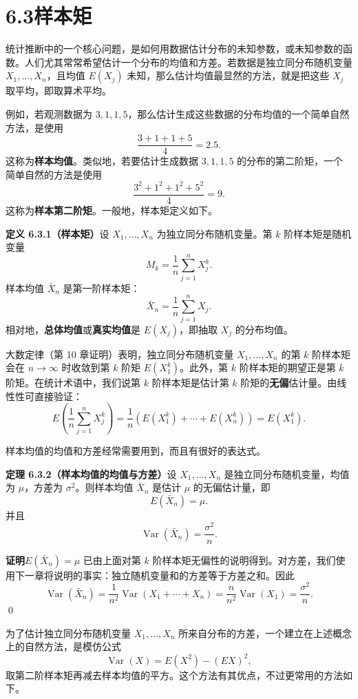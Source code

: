 \documentclass[UTF8,12pt,a4paper,fontset=fandol]{ctexart}
\begin{document}
\section*{6.3\quad 样本矩}

统计推断中的一个核心问题，是如何用数据估计分布的未知参数，或未知参数的函数。人们尤其常常希望估计一个分布的均值和方差。若数据是独立同分布随机变量 $X_1,\ldots,X_n$，且均值 $E(X_j)$ 未知，那么估计均值最显然的方法，就是把这些 $X_j$ 取平均，即取算术平均。

例如，若观测数据为 $3,1,1,5$，那么估计生成这些数据的分布均值的一个简单自然方法，是使用
\[
  \frac{3+1+1+5}{4}=2.5.
\]
这称为\textbf{样本均值}。类似地，若要估计生成数据 $3,1,1,5$ 的分布的第二阶矩，一个简单自然的方法是使用
\[
  \frac{3^2+1^2+1^2+5^2}{4}=9.
\]
这称为\textbf{样本第二阶矩}。一般地，样本矩定义如下。

\noindent\textbf{定义 6.3.1（样本矩）}\quad 设 $X_1,\ldots,X_n$ 为独立同分布随机变量。第 $k$ 阶样本矩是随机变量
\[
  M_k=\frac1n\sum_{j=1}^n X_j^k.
\]
样本均值 $\bar X_n$ 是第一阶样本矩：
\[
  \bar X_n=\frac1n\sum_{j=1}^n X_j.
\]
相对地，\textbf{总体均值}或\textbf{真实均值}是 $E(X_j)$，即抽取 $X_j$ 的分布均值。

大数定律（第 10 章证明）表明，独立同分布随机变量 $X_1,\ldots,X_n$ 的第 $k$ 阶样本矩会在 $n\to\infty$ 时收敛到第 $k$ 阶矩 $E(X_1^k)$。此外，第 $k$ 阶样本矩的期望正是第 $k$ 阶矩。在统计术语中，我们说第 $k$ 阶样本矩是估计第 $k$ 阶矩的\textbf{无偏}估计量。由线性性可直接验证：
\[
  E\left(\frac1n\sum_{j=1}^nX_j^k\right)
  =
  \frac1n\left(E(X_1^k)+\cdots+E(X_n^k)\right)
  =
  E(X_1^k).
\]

样本均值的均值和方差经常需要用到，而且有很好的表达式。

\noindent\textbf{定理 6.3.2（样本均值的均值与方差）}\quad 设 $X_1,\ldots,X_n$ 是独立同分布随机变量，均值为 $\mu$，方差为 $\sigma^2$。则样本均值 $\bar X_n$ 是估计 $\mu$ 的无偏估计量，即
\[
  E(\bar X_n)=\mu.
\]
并且
\[
  \operatorname{Var}(\bar X_n)=\frac{\sigma^2}{n}.
\]

\noindent\textbf{证明}\quad $E(\bar X_n)=\mu$ 已由上面对第 $k$ 阶样本矩无偏性的说明得到。对方差，我们使用下一章将说明的事实：独立随机变量和的方差等于方差之和。因此
\[
  \operatorname{Var}(\bar X_n)
  =
  \frac1{n^2}\operatorname{Var}(X_1+\cdots+X_n)
  =
  \frac{n}{n^2}\operatorname{Var}(X_1)
  =
  \frac{\sigma^2}{n}.
\]
\qed

为了估计独立同分布随机变量 $X_1,\ldots,X_n$ 所来自分布的方差，一个建立在上述概念上的自然方法，是模仿公式
\[
  \operatorname{Var}(X)=E(X^2)-(EX)^2,
\]
取第二阶样本矩再减去样本均值的平方。这个方法有其优点，不过更常用的方法如下。
\end{document}
